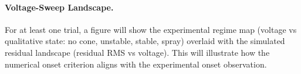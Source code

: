 \paragraph{Voltage-Sweep Landscape.} For at least one trial, a figure will show the experimental regime map (voltage vs qualitative state: no cone, unstable, stable, spray) overlaid with the simulated residual landscape (residual RMS vs voltage). This will illustrate how the numerical onset criterion aligns with the experimental onset observation.
